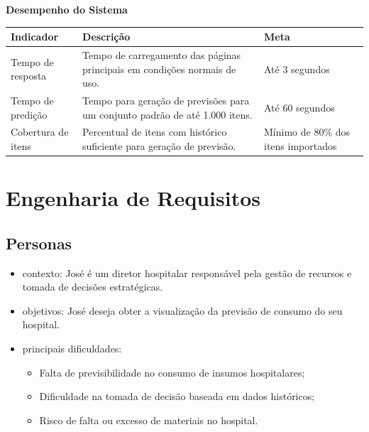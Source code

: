 \documentclass[12pt,a4paper]{article}
\begin{document}
\vspace{0.3cm}
\noindent\textbf{Desempenho do Sistema}

\begin{center}
\begin{tabular}{p{} p{} p{}}
\toprule
\textbf{Indicador} & \textbf{Descrição} & \textbf{Meta} \\
\midrule
Tempo de resposta & Tempo de carregamento das páginas principais 
em condições normais de uso. & Até 3 segundos \\
\midrule
Tempo de predição & Tempo para geração de previsões para um 
conjunto padrão de até 1.000 itens. & Até 60 segundos \\
\midrule
Cobertura de itens & Percentual de itens com histórico suficiente 
para geração de previsão. & Mínimo de 80\% dos itens importados \\
\bottomrule
\end{tabular}
\end{center}

\section{Engenharia de Requisitos}

\subsection{Personas}

\begin{itemize}
    \item contexto: José é um diretor hospitalar responsável pela gestão de recursos e tomada de decisões estratégicas.
    \item objetivos: José deseja obter a visualização da previsão de consumo do seu hospital.
    \item principais dificuldades:
    \begin{itemize}
        \item Falta de previsibilidade no consumo de insumos hospitalares;
        \item Dificuldade na tomada de decisão baseada em dados históricos;
        \item Risco de falta ou excesso de materiais no hospital.
    \end{itemize}
\end{itemize}
\end{document}
